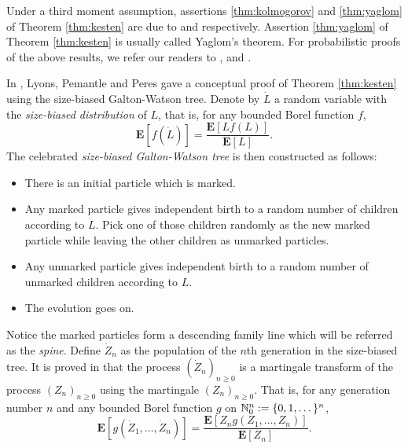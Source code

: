 \documentclass[12pt]{amsart}
\numberwithin{equation}{section}
\newcommand{\defn}[1]{{\em #1}}
\newcommand{\expr}[1]{\left( #1 \right)}
\newcommand{\brac}[1]{\left[ #1 \right]}
\newcommand{\expct}{\mathbf E}
\begin{document}
\par
	Under a third moment assumption, assertions \eqref{thm:kolmogorov} and \eqref{thm:yaglom} of Theorem \ref{thm:kesten} are due to \cite{kolmogorov1938losung} and \cite{yaglom1947certain} respectively. 
	Assertion 
	\eqref{thm:yaglom} 
	of Theorem \ref{thm:kesten} is usually called Yaglom's theorem.
	For probabilistic proofs of the above results, we refer our readers to \cite{lyons1995conceptual}, \cite{geiger1999elementary} and \cite{geiger2000new}.
\par
	In \cite{lyons1995conceptual}, Lyons, Pemantle and Peres gave a conceptual proof of Theorem \ref{thm:kesten} using the size-biased Galton-Watson tree. 
	Denote by $\dot L$ a random variable with the \defn{size-biased distribution} of $L$, that is, for any bounded Borel function $f$,
\begin{equation*}
		\expct\brac{f\expr{\dot L}}
	=
		\frac{\expct\brac{Lf(L)}}{\expct\brac{L}}.
\end{equation*}
	The celebrated \defn{size-biased Galton-Watson tree} is then constructed as follows:
\begin{itemize}
\item
	There is an initial particle which is marked.
\item
	Any marked particle gives independent birth to a random number of children according to $\dot L$. Pick one of those children randomly as the new marked particle while leaving
	the other children as unmarked particles.
\item
	Any unmarked particle gives independent birth to a random number of unmarked children according to $L$.
\item
	The evolution goes on.
\end{itemize}
\par
	Notice the marked particles form a descending family line which will be referred as the \defn{spine}. 
	Define $\dot Z_n$ as the population of the $n$th generation in the size-biased tree. 
	It is proved in \cite{lyons1995conceptual} that the process $(\dot Z_n)_{n\ge 0}$ is a martingale transform of the process $(Z_n)_{n\ge 0}$ using the martingale $(Z_n)_{n\ge 0}.$
	That is, for any generation number $n$ and any bounded Borel function $g$ on 
	$\mathbb N_0^{n} := \{0,1,\dots\}^n$,
\begin{equation}
\label{eq:htransformation}
		\expct\brac{g\expr{\dot Z_1,\dots,\dot Z_n}}
	=
        \frac{\expct\brac{Z_n g\expr{Z_1,\dots, Z_n}}}{\expct\brac{Z_n}}.
\end{equation}
\end{document}
